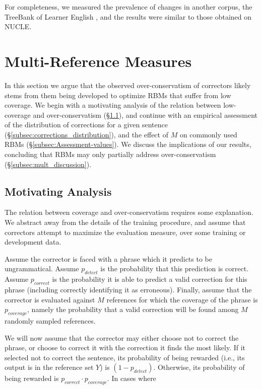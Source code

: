 \documentclass[letterpaper, 11pt]{article}
\begin{document}
For completeness, we measured the prevalence of changes in
another corpus, the TreeBank of Learner English \cite{yannakoudakis2011new},
and the results were similar to those obtained on NUCLE.
%
%
\vspace{-.1cm}
\section{Multi-Reference Measures}\label{sec:increase-reference}
%
In this section we argue that the observed over-conservatism of correctors likely stems
from them being developed to optimize RBMs that suffer from low coverage.
We begin with a motivating analysis of the relation between low-coverage and over-conservatism (\S \ref{subsec:motivating_analysis}),
and continue with an empirical assessment of the distribution of corrections for a given sentence (\S \ref{subsec:corrections_distribution}),
and the effect of $M$ on commonly used RBMs (\S \ref{subsec:Assessment-values}).
We discuss the implications of our results, concluding that RBMs may only partially address over-conservatism (\S \ref{subsec:mult_discussion}).
%
\vspace{-.2cm}
\subsection{Motivating Analysis}\label{subsec:motivating_analysis}
%
The relation between coverage and over-conservatism requires some explanation.
We abstract away from the details of the training procedure, and assume that correctors attempt to maximize the evaluation measure, over some training or development data.

Assume the corrector is faced with a phrase which it predicts to be ungrammatical. Assume $p_{detect}$ is the probability that this prediction is correct.
Assume $p_{correct}$ is the probability it is able to predict
a valid correction for this phrase (including correctly identifying it as erroneous).
Finally, assume that the corrector is evaluated
against $M$ references for which the coverage of the phrase is $p_{coverage}$,
namely the probability that
a valid correction will be found among $M$ randomly sampled references.

We will now assume that the corrector may either choose not to correct the phrase,
or choose to correct it with the correction it finds the most likely. If it selected not to correct the sentence, its probability of being rewarded (i.e., its output is in the reference set $Y$) is $(1-p_{detect})$. Otherwise, its probability
of being rewarded is $p_{correct} \cdot p_{coverage}$.
In cases where
\end{document}
